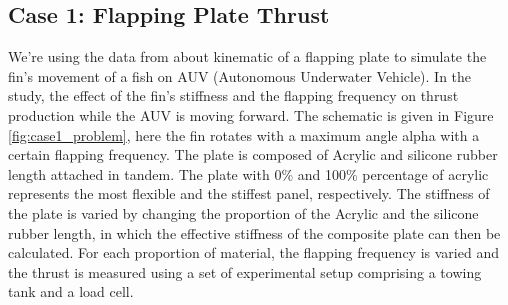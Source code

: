 \documentclass[conf]{new-aiaa}
\begin{document}
\subsection{Case 1: Flapping Plate Thrust}
We're using the data from \citet{Fathurrohim_et_al_2022} about kinematic of a flapping plate to simulate the fin's movement of a fish on AUV (Autonomous Underwater Vehicle). In the study, the effect of the fin's stiffness and the flapping frequency on thrust production while the AUV is moving forward. The schematic is given in Figure \ref{fig:case1_problem}, here the fin rotates with a maximum angle alpha with a certain flapping frequency. The plate is composed of Acrylic and silicone rubber length attached in tandem. The plate with 0\% and 100\% percentage of acrylic represents the most flexible and the stiffest panel, respectively. The stiffness of the plate is varied by changing the proportion of the Acrylic and the silicone rubber length, in which the effective stiffness of the composite plate can then be calculated. For each proportion of material, the flapping frequency is varied and the thrust is measured using a set of experimental setup comprising a towing tank and a load cell.
\end{document}
